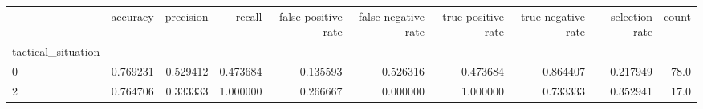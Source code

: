\begin{tabular}{lrrrrrrrrr}
\toprule
{} &  accuracy &  precision &    recall &  false positive rate &  false negative rate &  true positive rate &  true negative rate &  selection rate &  count \\
tactical\_situation &           &            &           &                      &                      &                     &                     &                 &        \\
\midrule
0                  &  0.769231 &   0.529412 &  0.473684 &             0.135593 &             0.526316 &            0.473684 &            0.864407 &        0.217949 &   78.0 \\
2                  &  0.764706 &   0.333333 &  1.000000 &             0.266667 &             0.000000 &            1.000000 &            0.733333 &        0.352941 &   17.0 \\
\bottomrule
\end{tabular}
